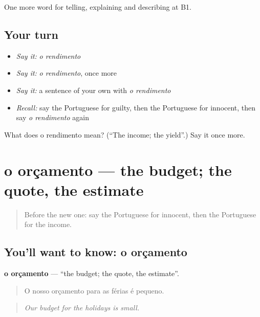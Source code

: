 \begin{grammarlens}[title={What you've built}]
One more word for telling, explaining and describing at B1.
\end{grammarlens}

\subsection*{Your turn}
\begin{itemize}
\raggedright
  \item \emph{Say it:} \emph{o rendimento}
  \item \emph{Say it:} \emph{o rendimento}, once more
  \item \emph{Say it:} a sentence of your own with \emph{o rendimento}
  \item \emph{Recall:} say the Portuguese for guilty, then the Portuguese for innocent, then say \emph{o rendimento} again
\end{itemize}

\begin{tcolorbox}[breakable,colback=teal!4,colframe=teal!35!black,title={Before you move on}]
What does o rendimento mean? (\textquotedblleft{}The income; the yield\textquotedblright{}.) Say it once more.
\end{tcolorbox}
\section[o orçamento]{o orçamento — the budget; the quote, the estimate}

\label{lesson:PT-C391-orcamento}



\begin{quote}
Before the new one: say the Portuguese for innocent, then the Portuguese for the income.
\end{quote}

\subsection*{You'll want to know: o orçamento}
\textbf{o orçamento} — \textquotedblleft{}the budget; the quote, the estimate\textquotedblright{}.

\begin{quote}
O nosso orçamento para as férias é pequeno.
\end{quote}

\begin{quote}
\emph{Our budget for the holidays is small.}
\end{quote}

